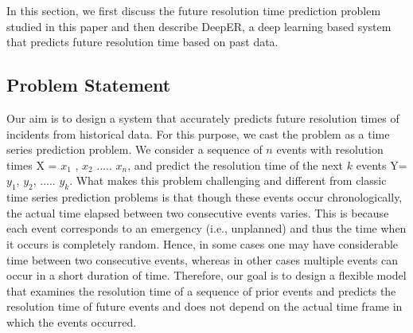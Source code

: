 
In this section, we first discuss the future resolution time prediction problem studied in this paper and then describe DeepER, a deep learning based system that predicts future resolution time based on past data.  



\subsection{Problem Statement}
Our aim is to design a system that accurately predicts future resolution times of incidents from historical data. For this purpose, we cast the problem as a time series prediction problem.  We consider a sequence of $n$ events with resolution times X = {$x_1$ , $x_2$ ..... $x_n$}, and predict the resolution time of the next $k$ events Y={ $y_{1}$, $y_{2}$, ..... $y_{k}$}.  What makes this problem challenging and different from classic time series prediction problems is that though these events occur chronologically, the actual time elapsed between two consecutive events varies. This is because each event corresponds to an emergency (i.e., unplanned)  and thus the time when it occurs is completely random. Hence, in some cases one may have considerable time between two consecutive events, whereas in other cases multiple events can occur in a short duration of time. Therefore, our goal is to design a flexible model that examines the resolution time of a sequence of prior events and predicts the resolution time of future events and does not depend on the actual time frame in which the events occurred.






